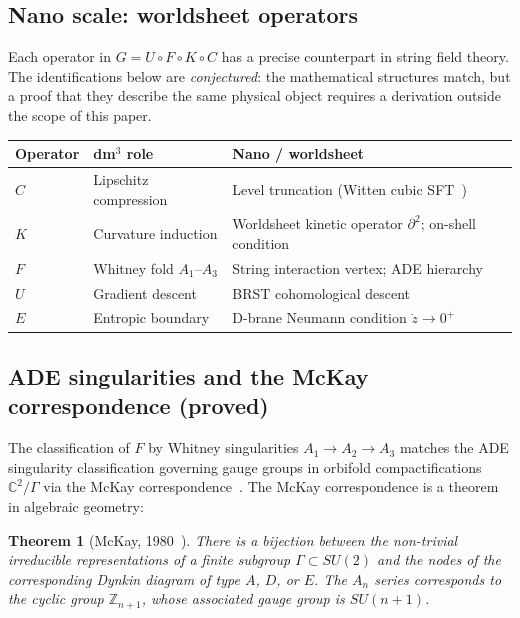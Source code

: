 \documentclass[12pt,a4paper]{article}
\theoremstyle{plain}
\newtheorem{theorem}{Theorem}[section]
\theoremstyle{definition}
\theoremstyle{remark}
\begin{document}
\subsection{Nano scale: worldsheet operators}

Each operator in $G=U\circ F\circ K\circ C$ has a precise counterpart in string
field theory.
The identifications below are \emph{conjectured}: the mathematical structures match,
but a proof that they describe the same physical object requires a derivation outside
the scope of this paper.

\begin{center}
\begin{tabular}{@{}p{1.8cm}p{4.2cm}p{5.5cm}@{}}
\toprule
\textbf{Operator} & \textbf{dm$^3$ role} & \textbf{Nano / worldsheet} \\
\midrule
$C$ & Lipschitz compression & Level truncation (Witten cubic SFT~\cite{Witten1986})\\
$K$ & Curvature induction & Worldsheet kinetic operator $\partial^2$; on-shell condition\\
$F$ & Whitney fold $A_1$--$A_3$ & String interaction vertex; ADE hierarchy\\
$U$ & Gradient descent & BRST cohomological descent~\cite{Zwiebach1993}\\
$E$ & Entropic boundary & D-brane Neumann condition $\dot z\to0^+$\\
\bottomrule
\end{tabular}
\end{center}

\subsection{ADE singularities and the McKay correspondence (proved)}

The classification of $F$ by Whitney singularities $A_1\to A_2\to A_3$ matches the
ADE singularity classification governing gauge groups in orbifold compactifications
$\mathbb{C}^2/\Gamma$ via the McKay correspondence~\cite{McKay1980}.
The McKay correspondence is a theorem in algebraic geometry:

\begin{theorem}[McKay, 1980~\cite{McKay1980}]
There is a bijection between the non-trivial irreducible representations of a finite
subgroup $\Gamma\subset SU(2)$ and the nodes of the corresponding Dynkin diagram
of type $A$, $D$, or $E$.
The $A_n$ series corresponds to the cyclic group $\mathbb{Z}_{n+1}$, whose
associated gauge group is $SU(n+1)$.
\end{theorem}
\end{document}
